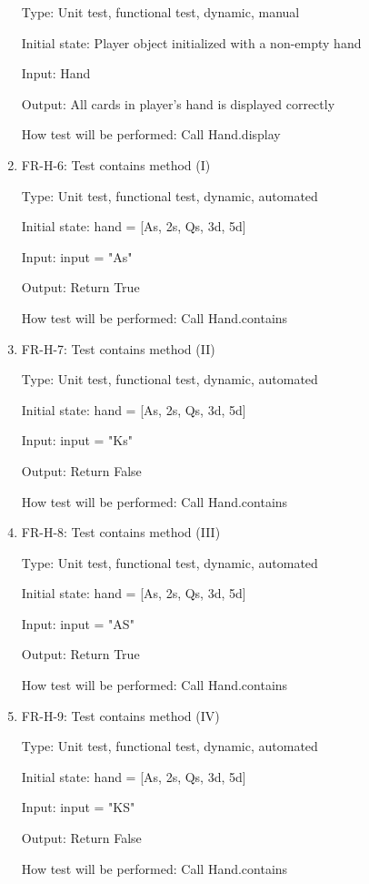 \documentclass[12pt, titlepage]{article}
\begin{document}
\begin{enumerate}
    Type: Unit test, functional test, dynamic, manual 
    					
    Initial state: Player object initialized with a non-empty hand
    
    Input: Hand
    
    Output: All cards in player's hand is displayed correctly
    
    How test will be performed: Call Hand.display
    
    \item{FR-H-6: Test contains method (I)}
    
    Type: Unit test, functional test, dynamic, automated
    
    Initial state: hand = [As, 2s, Qs, 3d, 5d]
    
    Input: input = "As"
    
    Output: Return True
    
    How test will be performed: Call Hand.contains
    
    \item{FR-H-7: Test contains method (II)}
    
    Type: Unit test, functional test, dynamic, automated
    
    Initial state: hand = [As, 2s, Qs, 3d, 5d]
    
    Input: input = "Ks"
    
    Output: Return False
    
    How test will be performed: Call Hand.contains
    
    \item{FR-H-8: Test contains method (III)}
    
    Type: Unit test, functional test, dynamic, automated
    
    Initial state: hand = [As, 2s, Qs, 3d, 5d]
    
    Input: input = "AS"
    
    Output: Return True
    
    How test will be performed: Call Hand.contains
    
    \item{FR-H-9: Test contains method (IV)}
    
    Type: Unit test, functional test, dynamic, automated
    
    Initial state: hand = [As, 2s, Qs, 3d, 5d]
    
    Input: input = "KS"
    
    Output: Return False
    
    How test will be performed: Call Hand.contains
\end{enumerate}
\end{document}

